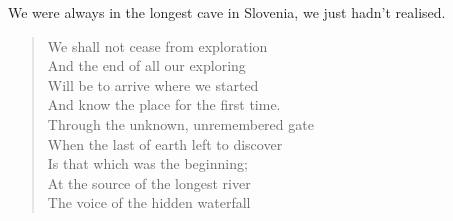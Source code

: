 We were always in the longest cave in Slovenia, we just hadn't realised.


\newpage
\begin{verse}
We shall not cease from exploration  \\
And the end of all our exploring  \\
Will be to arrive where we started  \\
And know the place for the first time. 
 \\
Through the unknown, unremembered gate  \\
When the last of earth left to discover  \\
Is that which was the beginning;  \\
At the source of the longest river  \\
The voice of the hidden waterfall \\
\end{verse}

